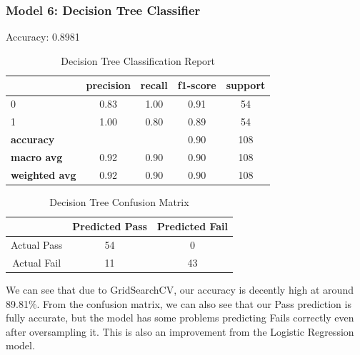 \documentclass[11pt,a4paper]{article}
\begin{document}
\subsubsection{Model 6: Decision Tree Classifier}
Accuracy: 0.8981
\begin{table}[H]
    \centering
    \begin{tabular}{lcccc}
        \hline
        & \textbf{precision} & \textbf{recall} & \textbf{f1-score} & \textbf{support} \\
        \hline
        0 & 0.83 & 1.00 & 0.91 & 54 \\
        1 & 1.00 & 0.80 & 0.89 & 54 \\
        \hline
        \textbf{accuracy} & & & 0.90 & 108 \\
        \textbf{macro avg} & 0.92 & 0.90 & 0.90 & 108 \\
        \textbf{weighted avg} & 0.92 & 0.90 & 0.90 & 108 \\
        \hline
    \end{tabular}
    \caption{Decision Tree Classification Report}
    \label{tab:dtclassification_report}
\end{table}
\begin{table}[H]
    \centering
    \begin{tabular}{|c|c|c|}
        \hline
        & Predicted Pass & Predicted Fail \\ \hline
        Actual Pass & 54 & 0 \\ \hline
        Actual Fail& 11 & 43 \\ \hline
    \end{tabular}
    \caption{Decision Tree Confusion Matrix}
    \label{tab:dtconfusion_matrix}
\end{table}

We can see that due to GridSearchCV, our accuracy is decently high at around 89.81\%. From the confusion matrix, we can also see that our Pass prediction is fully accurate, but the model has some problems predicting Fails correctly even after oversampling it. This is also an improvement from the Logistic Regression model.
\end{document}
